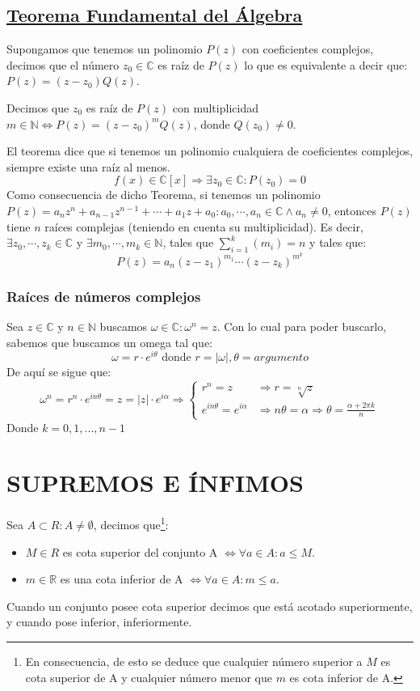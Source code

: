 \documentclass[10pt,a4paper,openright]{book}
\theoremstyle{break}
\begin{document}
\subsection{\underline{Teorema Fundamental del Álgebra}}
Supongamos que tenemos un polinomio $P(z)$ con coeficientes complejos, decimos que el número $z_0\in \mathbb C$ es raíz de $P(z)$ lo que es equivalente a decir que: $P(z)=(z-z_0)Q(z)$.\par
Decimos que $z_0$ es raíz de $P(z)$ con multiplicidad $m\in \mathbb N\Leftrightarrow P(z)=(z-z_0)^mQ(z)$, donde $Q(z_0)\neq 0$.\par
El teorema dice que si tenemos un polinomio cualquiera de coeficientes complejos, siempre existe una raíz al menos.
$$f(x)\in \mathbb C[x]\Rightarrow \exists z_0\in \mathbb C: P(z_0)=0$$
Como consecuencia de dicho Teorema, si tenemos un polinomio $P(z)=a_nz^n+a_{n-1}z^{n-1}+\cdots + a_1z+a_0: a_0,\cdots, a_n\in \mathbb C \wedge a_n\neq 0$, entonces $P(z)$ tiene $n$ raíces complejas (teniendo en cuenta su multiplicidad). Es decir, $\exists z_0,\cdots, z_k\in \mathbb C$ y $\exists m_0,\cdots, m_k\in \mathbb N$, tales que $\sum_{i=1}^k(m_i)=n$ y tales que:
$$P(z)=a_n(z-z_1)^{m_1}\cdots (z-z_k)^{m^k}$$

\subsubsection{Raíces de números complejos}
Sea $z\in \mathbb C$ y $n\in \mathbb N$ buscamos $\omega \in \mathbb C: \omega^n=z$. Con lo cual para poder buscarlo, sabemos que buscamos un omega tal que:
$$\omega=r\cdot e^{i\theta}\mbox{ donde }r=|\omega|, \theta=argumento$$
De aquí se sigue que:
$$\omega^n=r^n\cdot e^{in\theta}=z=|z|\cdot e^{i\alpha}\Rightarrow
\begin{cases}
r^n=z & \Rightarrow r=\sqrt[n]{z} \\
e^{in\theta}=e^{i\alpha} & \Rightarrow n\theta=\alpha\Rightarrow \theta=\frac{\alpha+2\pi k}{n}
\end{cases}
$$
Donde $k=0,1,..., n-1$

\section{SUPREMOS E ÍNFIMOS}
Sea $A\subset R: A\neq \emptyset$, decimos que\footnote{En consecuencia, de esto se deduce que cualquier número superior a $M$ es cota superior de A y cualquier número menor que $m$ es cota inferior de A.}:
\begin{itemize}
\item $M\in R$ es cota superior del conjunto A $\Leftrightarrow \forall a\in A: a\leq M$.

\item $m\in \mathbb R$ es una cota inferior de A $\Leftrightarrow \forall a\in A: m\leq a$.
\end{itemize}
Cuando un conjunto posee cota superior decimos que está acotado superiormente, y cuando pose inferior, inferiormente.\par
\end{document}
